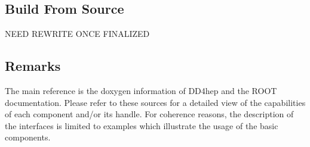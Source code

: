 \subsection{Build From Source}
\label{sec:dd4hep-user-manual-building-from-source}
NEED REWRITE ONCE FINALIZED
%
%


\subsection{Remarks}
\label{sec:dd4hep-user-manual-remarks}
The main reference is the doxygen information of DD4hep and the ROOT documentation. Please refer to these sources for a detailed view of the capabilities of each component and/or its handle. For coherence reasons, the description of the interfaces is limited to examples which illustrate the usage of the basic components. 

